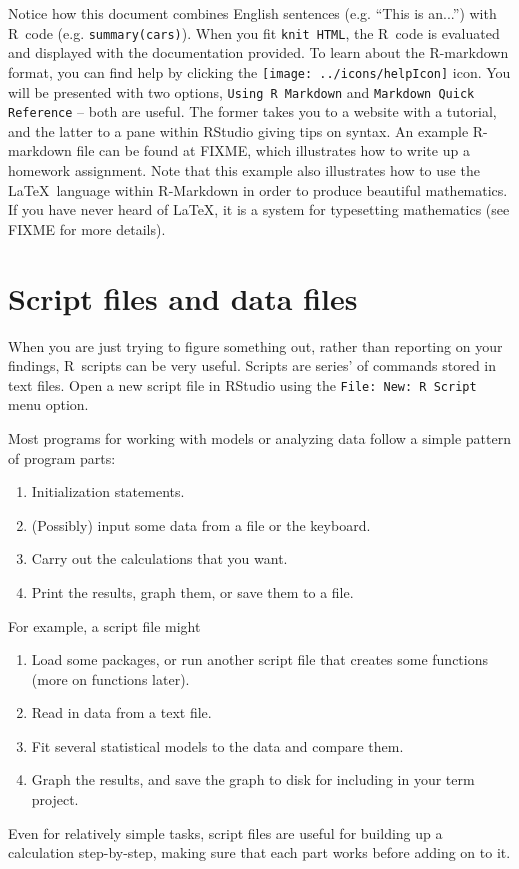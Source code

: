\documentclass[11pt]{article}\usepackage[]{graphicx}\usepackage[]{color}
\newcommand{\code}[1]{{\tt #1}}
\newcommand\R{{\sf R}}
\numberwithin{exercise}{section}
\begin{document}
Notice how this document combines English sentences (e.g. ``This is
an...'') with \R\ code (e.g. \code{summary(cars)}).  When you fit
\code{knit HTML}, the \R\ code is evaluated and displayed with the
documentation provided.  To learn about the \R-markdown format, you
can find help by clicking
the \texttt{[image: ../icons/helpIcon]} icon.  You will be
presented with two options, \code{Using R Markdown} and \code{Markdown
  Quick Reference} -- both are useful.  The former takes you to a
website with a tutorial, and the latter to a pane within RStudio
giving tips on syntax.  An example \R-markdown file can be found at
FIXME, which illustrates how to write up a homework assignment.  Note
that this example also illustrates how to use the \LaTeX\ language
within \R-Markdown in order to produce beautiful mathematics.  If you
have never heard of \LaTeX, it is a system for typesetting mathematics
(see FIXME for more details).

\section{Script files and data files}
When you are just trying to figure something out, rather than
reporting on your findings, \R\ scripts can be very useful.  Scripts
are series' of commands stored in text files. Open a new script file
in RStudio using the \code{File: New: R Script} menu option.

Most programs for working with models or analyzing data follow a
simple pattern of program parts:
\begin{enumerate}
\item Initialization statements.
\item (Possibly) input some data from a file or the keyboard.
\item Carry out the calculations that you want.
\item Print the results, graph them, or save them to a file.
\end{enumerate}

For example, a script file might
\begin{enumerate}
\item Load some packages, or run another script file that 
  creates some functions (more on functions later). 
\item Read in data from a text file.
\item Fit several statistical models to the data and
  compare them.
\item Graph the results, and save the graph to disk for including
  in your term project. 
\end{enumerate}
Even for relatively simple tasks, script files are useful for building
up a calculation step-by-step, making sure that each part works before
adding on to it.
\end{document}
